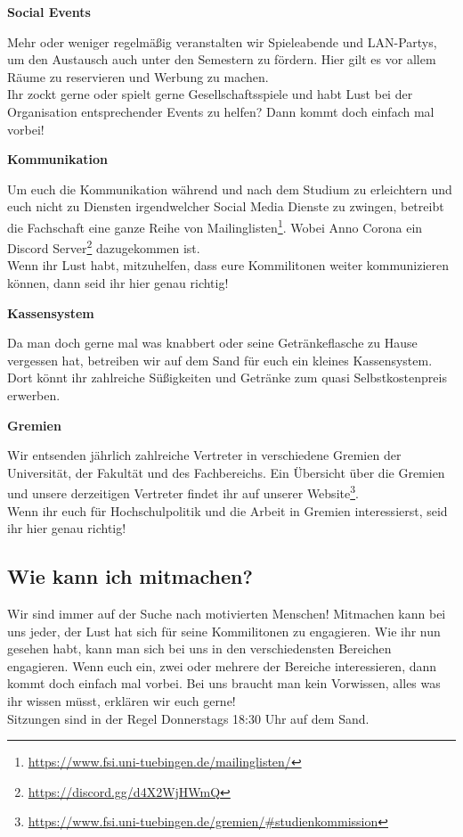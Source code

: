 \vfill \pagebreak
\textbf{Social Events}

Mehr oder weniger regelmäßig veranstalten wir Spieleabende und LAN-Partys, um
den Austausch auch unter den Semestern zu fördern. Hier gilt es vor allem Räume
zu reservieren und Werbung zu machen. \\
Ihr zockt gerne oder spielt gerne Gesellschaftsspiele und habt Lust bei der
Organisation entsprechender Events zu helfen? Dann kommt doch einfach mal
vorbei!

\textbf{Kommunikation}

Um euch die Kommunikation während und nach dem Studium zu erleichtern und euch
nicht zu Diensten irgendwelcher Social Media Dienste zu zwingen, betreibt die
Fachschaft eine ganze Reihe von
Mailinglisten\footnote{\url{https://www.fsi.uni-tuebingen.de/mailinglisten/}}.
Wobei Anno Corona ein Discord Server\footnote{\url{https://discord.gg/d4X2WjHWmQ}}
dazugekommen ist. \\
Wenn ihr Lust habt, mitzuhelfen, dass eure Kommilitonen weiter kommunizieren
können, dann seid ihr hier genau richtig!

\textbf{Kassensystem}

Da man doch gerne mal was knabbert oder seine Getränkeflasche zu Hause
vergessen hat, betreiben wir auf dem Sand für euch ein kleines Kassensystem.
Dort könnt ihr zahlreiche Süßigkeiten und Getränke zum quasi Selbstkostenpreis
erwerben. 

\textbf{Gremien}

Wir entsenden jährlich zahlreiche Vertreter in verschiedene Gremien der
Universität, der Fakultät und des Fachbereichs. Ein Übersicht über die Gremien
und unsere derzeitigen Vertreter findet ihr auf unserer
Website\footnote{\url{https://www.fsi.uni-tuebingen.de/gremien/\#studienkommission}}.
\\
Wenn ihr euch für Hochschulpolitik und die Arbeit in Gremien interessierst,
seid ihr hier genau richtig!

%
\subsection{Wie kann ich mitmachen?}
Wir sind immer auf der Suche nach motivierten Menschen! Mitmachen kann bei uns
jeder, der Lust hat sich für seine Kommilitonen zu engagieren. Wie ihr nun
gesehen habt, kann man sich bei uns in den verschiedensten Bereichen
engagieren. Wenn euch ein, zwei oder mehrere der Bereiche interessieren, dann
kommt doch einfach mal vorbei. Bei uns braucht man kein Vorwissen, alles was
ihr wissen müsst, erklären wir euch gerne!\\
Sitzungen sind in der Regel Donnerstags 18:30 Uhr auf dem Sand.

